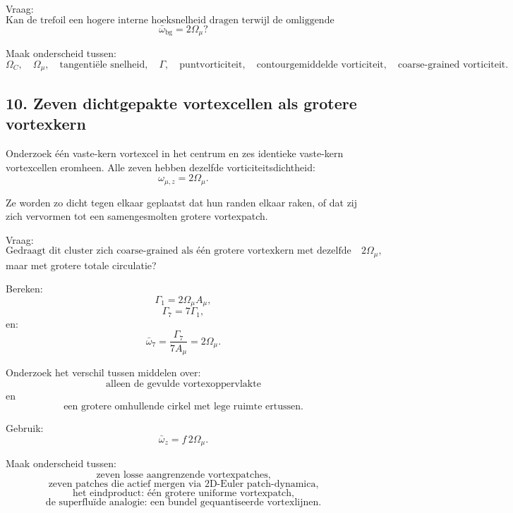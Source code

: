 \documentclass[11pt]{article}
\begin{document}
        Vraag:
        \[
            \text{Kan de trefoil een hogere interne hoeksnelheid dragen terwijl de omliggende coarse-grained achtergrondvorticiteit gelijk blijft aan}
        \]
        \[
            \bar{\omega}_{\mathrm{bg}}=2\Omega_{\mu}?
        \]
        
        Maak onderscheid tussen:
        \[
            \Omega_C,
            \quad
            \Omega_{\mu},
            \quad
            \text{tangentiële snelheid},
            \quad
            \Gamma,
            \quad
            \text{puntvorticiteit},
            \quad
            \text{contourgemiddelde vorticiteit},
            \quad
            \text{coarse-grained vorticiteit}.
        \]
    
    \subsection{10. Zeven dichtgepakte vortexcellen als grotere vortexkern}
        
        Onderzoek één vaste-kern vortexcel in het centrum en zes identieke vaste-kern vortexcellen eromheen. Alle zeven hebben dezelfde vorticiteitsdichtheid:
        \[
            \omega_{\mu,z}=2\Omega_{\mu}.
        \]
        
        Ze worden zo dicht tegen elkaar geplaatst dat hun randen elkaar raken, of dat zij zich vervormen tot een samengesmolten grotere vortexpatch.
        
        Vraag:
        \[
            \text{Gedraagt dit cluster zich coarse-grained als één grotere vortexkern met dezelfde effectieve vorticiteitsdichtheid }2\Omega_{\mu},
        \]
        maar met grotere totale circulatie?
        
        Bereken:
        \[
            \Gamma_1=2\Omega_{\mu}A_{\mu},
        \]
        \[
            \Gamma_7=7\Gamma_1,
        \]
        en:
        \[
            \bar{\omega}_7
            =
            \frac{\Gamma_7}{7A_{\mu}}
            =
            2\Omega_{\mu}.
        \]
        
        Onderzoek het verschil tussen middelen over:
        \[
            \text{alleen de gevulde vortexoppervlakte}
        \]
        en
        \[
            \text{een grotere omhullende cirkel met lege ruimte ertussen.}
        \]
        
        Gebruik:
        \[
            \bar{\omega}_z=f\,2\Omega_{\mu}.
        \]
        
        Maak onderscheid tussen:
        \[
            \text{zeven losse aangrenzende vortexpatches,}
        \]
        \[
            \text{zeven patches die actief mergen via 2D-Euler patch-dynamica,}
        \]
        \[
            \text{het eindproduct: één grotere uniforme vortexpatch,}
        \]
        \[
            \text{de superfluïde analogie: een bundel gequantiseerde vortexlijnen.}
        \]
    
\end{document}
